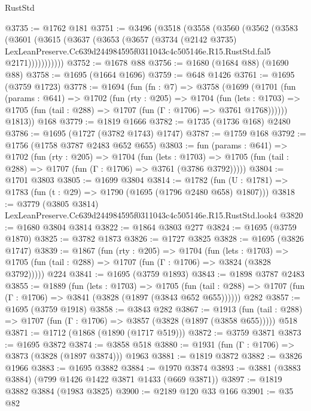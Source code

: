 \begin{lexlean}{RustStd}
\begin{coremodule}
@3735 := @1762 @181
@3751 := @3496
    (@3518
      (@3558
        (@3560
          (@3562
            (@3583
              (@3601
                (@3615
                  (@3637
                    (@3653
                      (@3657
                        (@3734
                          (@2142 @3735)
                          LexLeanPreserve.Cc639d244984595f0311043c4c505146e.R15.RustStd.fal5
                          @2171)))))))))))
@3752 := @1678 @88
@3756 := @1680 (@1684 @88) (@1690 @88)
@3758 := @1695 (@1664 @1696)
@3759 := @648 @1426
@3761 := @1695 (@3759 @1723)
@3778 := @1694
    (fun (fn : @7) =>
    @3758
      (@1699
        (@1701
          (fun (params : @641) =>
          @1702
            (fun (rty : @205) =>
            @1704
              (fun (lets : @1703) =>
              @1705 (fun (tail : @288) => @1707 (fun (Γ : @1706) => @3761 @1768))))))
        @1813))
    @168
@3779 := @1819 @1666
@3782 := @1735 (@1736 @168) @2480
@3786 := @1695 (@1727 (@3782 @1743) @1747)
@3787 := @1759 @168
@3792 := @1756 (@1758 @3787 @2483 @652 @655)
@3803 := fun (params : @641) =>
  @1702
    (fun (rty : @205) =>
    @1704
      (fun (lets : @1703) =>
      @1705 (fun (tail : @288) => @1707 (fun (Γ : @1706) => @3761 (@3786 @3792)))))
@3804 := @1701 @3803
@3805 := @1699 @3804
@3814 := @1782 (fun (U : @1781) => @1783 (fun (t : @29) => @1790 (@1695 (@1796 @2480 @658) @1807)))
@3818 := @3779 (@3805 @3814) LexLeanPreserve.Cc639d244984595f0311043c4c505146e.R15.RustStd.look4
@3820 := @1680 @3804 @3814
@3822 := @1864 @3803 @277
@3824 := @1695 (@3759 @1870)
@3825 := @3782 @1873
@3826 := @1727 @3825
@3828 := @1695 (@3826 @1747)
@3839 := @1867
    (fun (rty : @205) =>
    @1704
      (fun (lets : @1703) =>
      @1705 (fun (tail : @288) => @1707 (fun (Γ : @1706) => @3824 (@3828 @3792)))))
    @224
@3841 := @1695 (@3759 @1893)
@3843 := @1898 @3787 @2483
@3855 := @1889
    (fun (lets : @1703) =>
    @1705 (fun (tail : @288) => @1707 (fun (Γ : @1706) => @3841 (@3828 (@1897 (@3843 @652 @655))))))
    @282
@3857 := @1695 (@3759 @1918)
@3858 := @3843 @282
@3867 := @1913
    (fun (tail : @288) => @1707 (fun (Γ : @1706) => @3857 (@3828 (@1897 (@3858 @655)))))
    @518
@3871 := @1712 (@1868 (@1890 (@1717 @519)))
@3872 := @3759 @3871
@3873 := @1695 @3872
@3874 := @3858 @518
@3880 := @1931 (fun (Γ : @1706) => @3873 (@3828 (@1897 @3874))) @1963
@3881 := @1819 @3872
@3882 := @3826 @1966
@3883 := @1695 @3882
@3884 := @1970 @3874
@3893 := @3881 (@3883 @3884) (@799 @1426 @1422 @3871 @1433 (@669 @3871))
@3897 := @1819 @3882 @3884 (@1983 @3825)
@3900 := @2189 @120 @33 @166
@3901 := @35 @82

\end{coremodule}
\end{lexlean}
